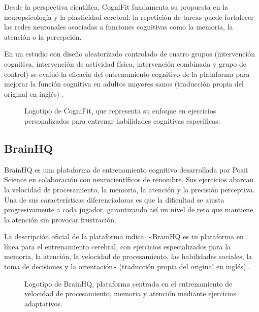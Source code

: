 \documentclass[12pt, a4paper]{report}
\begin{document}
Desde la perspectiva científica, CogniFit fundamenta su propuesta en la
neuropsicología y la plasticidad cerebral: la repetición de tareas puede
fortalecer las redes neuronales asociadas a funciones cognitivas como la
memoria, la atención o la percepción.

En un estudio con diseño aleatorizado controlado de cuatro grupos
(intervención cognitiva, intervención de actividad física, intervención
combinada y grupo de control) se evaluó la eficacia del entrenamiento cognitivo
de la plataforma para mejorar la función cognitiva en adultos mayores sanos
(traducción propia del original en inglés) \citep{CogniFitWeb}.

\begin{figure}[H]
  \centering
  \caption{Logotipo de CogniFit, que representa su enfoque en ejercicios
    personalizados para entrenar habilidades cognitivas específicas.}
  \label{fig:cognifit}
\end{figure}

\subsection{BrainHQ}

BrainHQ es una plataforma de entrenamiento cognitivo desarrollada por Posit
Science en colaboración con neurocientíficos de renombre. Sus ejercicios abarcan
la velocidad de procesamiento, la memoria, la atención y la precisión perceptiva.
Una de sus características diferenciadoras es que la dificultad se ajusta
progresivamente a cada jugador, garantizando así un nivel de reto que mantiene
la atención sin provocar frustración.

La descripción oficial de la plataforma indica: «BrainHQ es tu plataforma en
línea para el entrenamiento cerebral, con ejercicios especializados para la
memoria, la atención, la velocidad de procesamiento, las habilidades sociales,
la toma de decisiones y la orientación» (traducción propia del original en
inglés) \citep{BrainHQWeb}.

\begin{figure}[H]
  \centering
  \caption{Logotipo de BrainHQ, plataforma centrada en el entrenamiento de
    velocidad de procesamiento, memoria y atención mediante ejercicios adaptativos.}
  \label{fig:brainhq}
\end{figure}
\end{document}
